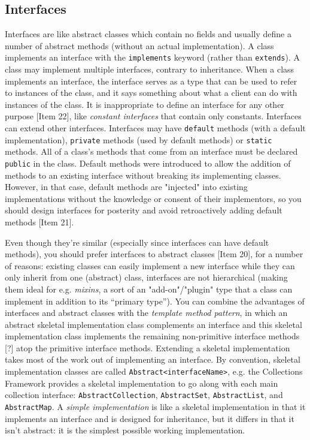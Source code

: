 \documentclass[table, xcdraw]{article}%
\begin{document}
\subsection{Interfaces}

Interfaces are like abstract classes which contain no fields and usually define a number of abstract methods (without an actual implementation). A class implements an interface with the \texttt{implements} keyword (rather than \texttt{extends}). A class may implement multiple interfaces, contrary to inheritance. When a class implements an interface, the interface serves as a type that can be used to refer to instances of the class, and it says something about what a client can do with instances of the class. It is inappropriate to define an interface for any other purpose [Item 22], like \emph{constant interfaces} that contain only constants. Interfaces can extend other interfaces. Interfaces may have \texttt{default} methods (with a default implementation), \texttt{private} methods (used by default methods) or \texttt{static} methods. All of a class's methods that come from an interface must be declared \texttt{public} in the class. Default methods were introduced to allow the addition of methods to an existing interface without breaking its implementing classes. However, in that case, default methods are "injected" into existing implementations without the knowledge or consent of their implementors, so you should design interfaces for posterity and avoid retroactively adding default methods [Item 21].

Even though they're similar (especially since interfaces can have default methods), you should prefer interfaces to abstract classes [Item 20], for a number of reasons: existing classes can easily implement a new interface while they can only inherit from one (abstract) class, interfaces are not hierarchical (making them ideal for e.g. \emph{mixins}, a sort of an "add-on"/"plugin" type that a class can implement in addition to its “primary type”). You can combine the advantages of interfaces and abstract classes with the \emph{template method pattern}, in which an abstract skeletal implementation class complements an interface and this skeletal implementation class implements the remaining non-primitive interface methods [?] atop the primitive interface methods. Extending a skeletal implementation takes most of the work out of implementing an interface. By convention, skeletal implementation classes are called \texttt{Abstract<interfaceName>}, e.g. the Collections Framework provides a skeletal implementation to go along with each main collection interface: \texttt{AbstractCollection}, \texttt{AbstractSet}, \texttt{AbstractList}, and \texttt{AbstractMap}. A \emph{simple implementation} is like a skeletal implementation in that it implements an interface and is designed for inheritance, but it differs in that it isn't abstract: it is the simplest possible working implementation.
\end{document}
